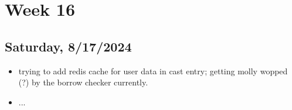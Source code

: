 \newpage
\section{Week 16}

\subsection*{Saturday, 8/17/2024}
\begin{itemize}
    \item trying to add redis cache for user data in cast entry; getting molly
        wopped (?) by the borrow checker currently.
    \item ...
\end{itemize}
